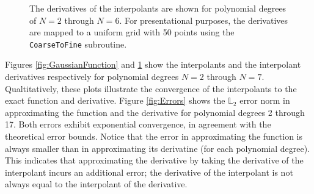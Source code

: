\documentclass[12pt]{softwaremanual}
\begin{document}
\begin{figure}
\begin{center}

   \caption{ The derivatives of the interpolants are shown for polynomial degrees of $N=2$ through $N=6$. For presentational purposes, the derivatives are mapped to a uniform grid with 50 points using the \texttt{CoarseToFine} subroutine. }\label{fig:GaussianDerivative}
\end{center}
\end{figure} 


Figures \ref{fig:GaussianFunction} and \ref{fig:GaussianDerivative} show the interpolants and the interpolant derivatives respectively for polynomial degrees $N=2$ through $N=7$. Qualtitatively, these plots illustrate the convergence of the interpolants to the exact function and derivative. Figure \ref{fig:Errors} shows the $\mathbb{L}_2$ error norm in approximating the function and the derivative for polynomial degrees 2 through 17. Both errors exhibit exponential convergence, in agreement with the theoretical error bounds. Notice that the error in approximating the function is always smaller than in approximating its derivatine (for each polynomial degree). This indicates that approximating the derivative by taking the derivative of the interpolant incurs an additional error; the derivative of the interpolant is not always equal to the interpolant of the derivative.
\end{document}
